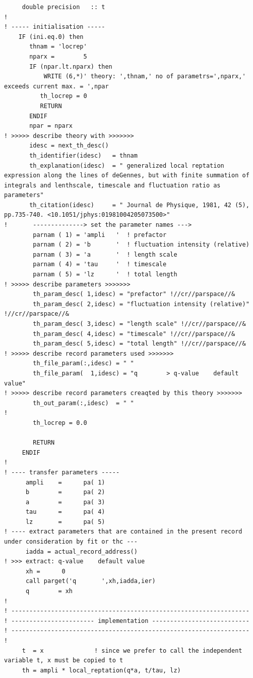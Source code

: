 \documentclass[11pt,fleqn]{book} %
\begin{document}
\begin{verbatim}
     double precision   :: t
!
! ----- initialisation ----- 
    IF (ini.eq.0) then     
       thnam = 'locrep'
       nparx =        5
       IF (npar.lt.nparx) then
           WRITE (6,*)' theory: ',thnam,' no of parametrs=',nparx,' exceeds current max. = ',npar
          th_locrep = 0
          RETURN
       ENDIF
       npar = nparx
! >>>>> describe theory with >>>>>>> 
       idesc = next_th_desc()
       th_identifier(idesc)   = thnam
       th_explanation(idesc)  = " generalized local reptation expression along the lines of deGennes, but with finite summation of integrals and lenthscale, timescale and fluctuation ratio as parameters"
       th_citation(idesc)     = " Journal de Physique, 1981, 42 (5), pp.735-740. <10.1051/jphys:01981004205073500>"
!       --------------> set the parameter names --->
        parnam ( 1) = 'ampli   '  ! prefactor                                                                       
        parnam ( 2) = 'b       '  ! fluctuation intensity (relative)                                                
        parnam ( 3) = 'a       '  ! length scale                                                                    
        parnam ( 4) = 'tau     '  ! timescale                                                                       
        parnam ( 5) = 'lz      '  ! total length                                                                    
! >>>>> describe parameters >>>>>>> 
        th_param_desc( 1,idesc) = "prefactor" !//cr//parspace//&
        th_param_desc( 2,idesc) = "fluctuation intensity (relative)" !//cr//parspace//&
        th_param_desc( 3,idesc) = "length scale" !//cr//parspace//&
        th_param_desc( 4,idesc) = "timescale" !//cr//parspace//&
        th_param_desc( 5,idesc) = "total length" !//cr//parspace//&
! >>>>> describe record parameters used >>>>>>>
        th_file_param(:,idesc) = " " 
        th_file_param(  1,idesc) = "q        > q-value    default value"
! >>>>> describe record parameters creaqted by this theory >>>>>>> 
        th_out_param(:,idesc)  = " "
! 
        th_locrep = 0.0
 
        RETURN
     ENDIF
!
! ---- transfer parameters -----
      ampli    =      pa( 1)
      b        =      pa( 2)
      a        =      pa( 3)
      tau      =      pa( 4)
      lz       =      pa( 5)
! ---- extract parameters that are contained in the present record under consideration by fit or thc ---
      iadda = actual_record_address()
! >>> extract: q-value    default value
      xh =      0
      call parget('q       ',xh,iadda,ier)
      q        = xh
! 
! ------------------------------------------------------------------
! ----------------------- implementation ---------------------------
! ------------------------------------------------------------------
! 
     t  = x              ! since we prefer to call the independent variable t, x must be copied to t
     th = ampli * local_reptation(q*a, t/tau, lz)


\end{verbatim}
\end{document}
